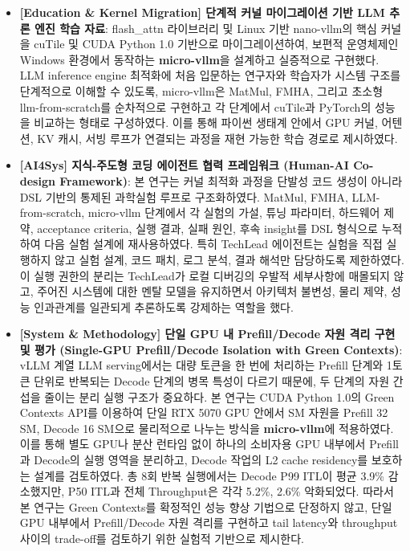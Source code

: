 \documentclass{kcc}            %
\begin{document}
\begin{itemize}
\item \textbf{[Education \& Kernel Migration] 단계적 커널 마이그레이션 기반 LLM 추론 엔진 학습 자료}: flash\_attn 라이브러리 및 Linux 기반 nano-vllm의 핵심 커널을 cuTile 및 CUDA Python 1.0 기반으로 마이그레이션하여, 보편적 운영체제인 Windows 환경에서 동작하는 \textbf{micro-vllm}을 설계하고 실증적으로 구현했다. LLM inference engine 최적화에 처음 입문하는 연구자와 학습자가 시스템 구조를 단계적으로 이해할 수 있도록, micro-vllm은 MatMul, FMHA, 그리고 초소형 llm-from-scratch를 순차적으로 구현하고 각 단계에서 cuTile과 PyTorch의 성능을 비교하는 형태로 구성하였다. 이를 통해 파이썬 생태계 안에서 GPU 커널, 어텐션, KV 캐시, 서빙 루프가 연결되는 과정을 재현 가능한 학습 경로로 제시하였다.
\item \textbf{[AI4Sys] 지식-주도형 코딩 에이전트 협력 프레임워크 (Human-AI Co-design Framework)}: 본 연구는 커널 최적화 과정을 단발성 코드 생성이 아니라 DSL 기반의 통제된 과학실험 루프로 구조화하였다. MatMul, FMHA, LLM-from-scratch, micro-vllm 단계에서 각 실험의 가설, 튜닝 파라미터, 하드웨어 제약, acceptance criteria, 실행 결과, 실패 원인, 후속 insight를 DSL 형식으로 누적하여 다음 실험 설계에 재사용하였다. 특히 TechLead 에이전트는 실험을 직접 실행하지 않고 실험 설계, 코드 패치, 로그 분석, 결과 해석만 담당하도록 제한하였다. 이 실행 권한의 분리는 TechLead가 로컬 디버깅의 우발적 세부사항에 매몰되지 않고, 주어진 시스템에 대한 멘탈 모델을 유지하면서 아키텍처 불변성, 물리 제약, 성능 인과관계를 일관되게 추론하도록 강제하는 역할을 했다.
\item \textbf{[System \& Methodology] 단일 GPU 내 Prefill/Decode 자원 격리 구현 및 평가 (Single-GPU Prefill/Decode Isolation with Green Contexts)}: vLLM 계열 LLM serving에서는 대량 토큰을 한 번에 처리하는 Prefill 단계와 1토큰 단위로 반복되는 Decode 단계의 병목 특성이 다르기 때문에, 두 단계의 자원 간섭을 줄이는 분리 실행 구조가 중요하다. 본 연구는 CUDA Python 1.0의 Green Contexts API를 이용하여 단일 RTX 5070 GPU 안에서 SM 자원을 Prefill 32 SM, Decode 16 SM으로 물리적으로 나누는 방식을 \textbf{micro-vllm}에 적용하였다. 이를 통해 별도 GPU나 분산 런타임 없이 하나의 소비자용 GPU 내부에서 Prefill과 Decode의 실행 영역을 분리하고, Decode 작업의 L2 cache residency를 보호하는 설계를 검토하였다. 총 8회 반복 실행에서는 Decode P99 ITL이 평균 3.9\% 감소했지만, P50 ITL과 전체 Throughput은 각각 5.2\%, 2.6\% 악화되었다. 따라서 본 연구는 Green Contexts를 확정적인 성능 향상 기법으로 단정하지 않고, 단일 GPU 내부에서 Prefill/Decode 자원 격리를 구현하고 tail latency와 throughput 사이의 trade-off를 검토하기 위한 실험적 기반으로 제시한다.

\end{itemize}
\end{document}
